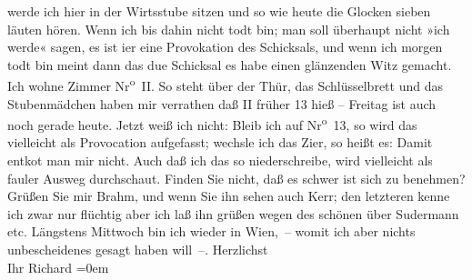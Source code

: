 \begin{ledgroupsized}[t]{13cm}
               werde ich hier in der Wirtsstube sitzen und so wie heute die Glocken sieben {\pb}läuten hören. Wenn ich bis dahin
               nicht todt bin; man soll überhaupt nicht »ich werde« sagen, es ist i{\geminationm}er eine Provokation des Schicksals, und wenn ich morgen
               todt bin meint dann das du{\geminationm}e Schicksal es habe einen
               glänzenden Witz gemacht.\pend
           \pstart
           {\pb}Ich wohne Zimmer Nr\textsuperscript{o} II. So steht über der Thür, das Schlüsselbrett und das
               Stubenmädchen haben mir verrathen daß II früher 13 hieß – Freitag ist auch noch
               gerade heute. Jetzt weiß ich nicht: Bleib ich auf Nr\textsuperscript{o} 13,
               so wird das vielleicht als Provocation aufgefasst; {\pb}wechsle ich das Zi{\geminationm}er, so heißt es: Damit entko{\geminationm}t man mir nicht. Auch daß ich das so niederschreibe,
               wird vielleicht als fauler Ausweg durchschaut. Finden Sie nicht, daß es schwer ist
               sich zu benehmen? Grüßen Sie mir Brahm, und wenn
               Sie ihn {\pb}sehen auch Kerr; den letzteren kenne ich zwar nur flüchtig
               aber ich laß ihn grüßen wegen des schönen \label{K_L00913_3v}\label{K_L00913_3h} über Sudermann
               etc.\pend
           \pstart
           Längstens Mittwoch bin ich wieder in Wien, – womit ich aber nichts unbescheidenes gesagt haben will –.\pend
           \pstart
           Herzlichst {\\[\baselineskip]}Ihr \spacefill\mbox{Richard}\pend
           \leftskip=0em{}
         
         \endnumbering{}\end{ledgroupsized}  \newcommand{\dateiname}{L00913}\newcommand{\titel}{Richard Beer-Hofmann an Arthur Schnitzler, 28. 4. 1899}\newcommand{\editorInnen}{Martin Anton Müller und Gerd-Hermann Susen}
      